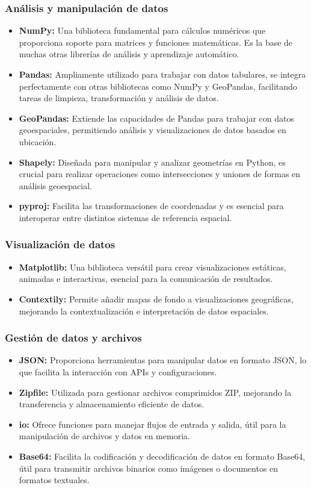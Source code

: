 \subsubsection{Análisis y manipulación de datos}
\begin{itemize}
    \item \textbf{NumPy:} Una biblioteca fundamental para cálculos numéricos que proporciona soporte para matrices y funciones matemáticas. Es la base de muchas otras librerías de análisis y aprendizaje automático.
    \item \textbf{Pandas:} Ampliamente utilizado para trabajar con datos tabulares, se integra perfectamente con otras bibliotecas como NumPy y GeoPandas, facilitando tareas de limpieza, transformación y análisis de datos.
    \item \textbf{GeoPandas:} Extiende las capacidades de Pandas para trabajar con datos geoespaciales, permitiendo análisis y visualizaciones de datos basados en ubicación.
    \item \textbf{Shapely:} Diseñada para manipular y analizar geometrías en Python, es crucial para realizar operaciones como intersecciones y uniones de formas en análisis geoespacial.
    \item \textbf{pyproj:} Facilita las transformaciones de coordenadas y es esencial para interoperar entre distintos sistemas de referencia espacial.
\end{itemize}

\subsubsection{Visualización de datos}
\begin{itemize}
    \item \textbf{Matplotlib:} Una biblioteca versátil para crear visualizaciones estáticas, animadas e interactivas, esencial para la comunicación de resultados.
    \item \textbf{Contextily:} Permite añadir mapas de fondo a visualizaciones geográficas, mejorando la contextualización e interpretación de datos espaciales.
\end{itemize}

\subsubsection{Gestión de datos y archivos}
\begin{itemize}
    \item \textbf{JSON:} Proporciona herramientas para manipular datos en formato JSON, lo que facilita la interacción con APIs y configuraciones.
    \item \textbf{Zipfile:} Utilizada para gestionar archivos comprimidos ZIP, mejorando la transferencia y almacenamiento eficiente de datos.
    \item \textbf{io:} Ofrece funciones para manejar flujos de entrada y salida, útil para la manipulación de archivos y datos en memoria.
    \item \textbf{Base64:} Facilita la codificación y decodificación de datos en formato Base64, útil para transmitir archivos binarios como imágenes o documentos en formatos textuales.
\end{itemize}

